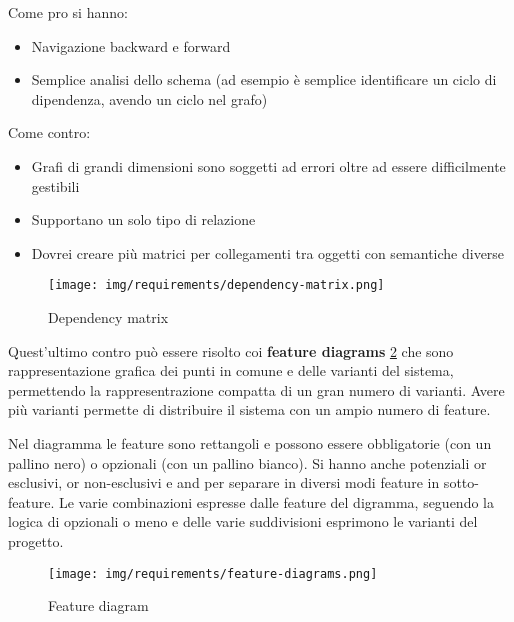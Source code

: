 Come pro si hanno:
\begin{itemize}
    \item Navigazione backward e forward
    \item Semplice analisi dello schema (ad esempio è semplice identificare un
          ciclo di dipendenza, avendo un ciclo nel grafo)
\end{itemize}
Come contro:
\begin{itemize}
    \item Grafi di grandi dimensioni sono soggetti ad errori oltre ad essere
          difficilmente gestibili
    \item Supportano un solo tipo di relazione
    \item Dovrei creare più matrici per collegamenti tra oggetti con semantiche
          diverse
\end{itemize}

\begin{figure}[!ht]
      \centering
      \texttt{[image: img/requirements/dependency-matrix.png]}
      \caption{Dependency matrix}
      \label{fig:dependency-matrix}
\end{figure}

Quest'ultimo contro può essere risolto coi \textbf{feature diagrams} \ref{fig:feature-diagram} che sono
rappresentazione grafica dei punti in comune e delle varianti del sistema, permettendo
la rappresentrazione compatta di un gran numero di varianti. Avere più varianti
permette di distribuire il sistema con un ampio numero di feature.

Nel diagramma le feature sono rettangoli e possono essere obbligatorie (con un
pallino nero) o opzionali (con un pallino bianco). Si hanno anche potenziali or
esclusivi, or non-esclusivi e and per separare in diversi modi feature in sotto-feature.
Le varie combinazioni espresse dalle feature del digramma, seguendo la logica di
opzionali o meno e delle varie suddivisioni esprimono le varianti del progetto.

\begin{figure}[!ht]
      \centering
      \texttt{[image: img/requirements/feature-diagrams.png]}
      \caption{Feature diagram}
      \label{fig:feature-diagram}
\end{figure}